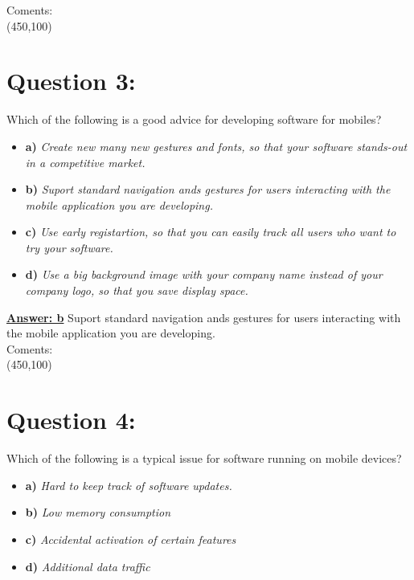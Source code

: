 \documentclass[12pt,a4paper,norsk]{article}
\begin{document}
\noindent Coments:\\
\framebox(450,100){}\\

\section {Question 3:} Which of the following is a good advice for developing software for mobiles?\\

\begin{itemize}
 \item \textbf{a)} \textit{Create new many new gestures and fonts, so that your software stands-out in a competitive market.}
 \item \textbf{b)} \textit{Suport standard navigation ands gestures for users interacting with the mobile application you are developing.}
 \item \textbf{c)} \textit{Use early registartion, so that you can easily track all users who want to try your software.}
 \item \textbf{d)} \textit{Use a big background image with your company name instead of your company logo, so that you save display space.}
\end{itemize}

\underline{\textbf{Answer: b}} Suport standard navigation ands gestures for users interacting with the mobile application you are developing. \\

\noindent Coments:\\
\framebox(450,100){}\\

\section {Question 4:} Which of the following is a typical issue for software running on mobile devices?\\

\begin{itemize}
 \item \textbf{a)} \textit{Hard to keep track of software updates.}
 \item \textbf{b)} \textit{Low memory consumption}
 \item \textbf{c)} \textit{Accidental activation of certain features}
 \item \textbf{d)} \textit{Additional data traffic}


\end{itemize}
\end{document}
